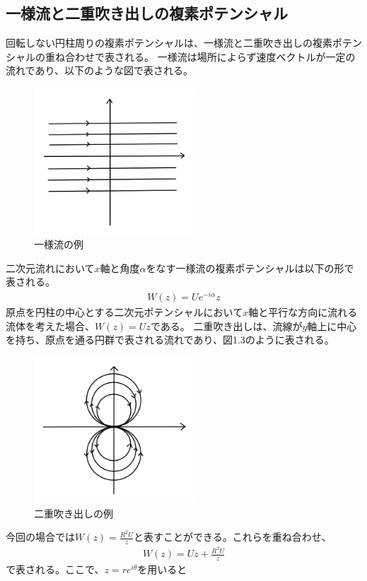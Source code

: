 \documentclass[10pt,b5paper,papersize,dvipdfmx]{jsbook}
\begin{document}
\subsection{一様流と二重吹き出しの複素ポテンシャル}
回転しない円柱周りの複素ポテンシャルは、一様流と二重吹き出しの複素ポテンシャルの重ね合わせで表される。
一様流は場所によらず速度ベクトルが一定の流れであり、以下のような図で表される。
\begin{figure}[ht]
  \centering
  \includegraphics[width=60mm]{img/ryuutai3.png}
  \caption{一様流の例}
\end{figure}
\par
二次元流れにおいて$x$軸と角度$\alpha$をなす一様流の複素ポテンシャルは以下の形で表される。
\begin{align}
  W(z) = Ue^{-i\alpha}z
\end{align}
原点を円柱の中心とする二次元ポテンシャルにおいて$x$軸と平行な方向に流れる流体を考えた場合、$W(z) = Uz$である。
二重吹き出しは、流線が$y$軸上に中心を持ち、原点を通る円群で表される流れであり、図1.3のように表される。
\begin{figure}[ht]
  \centering
  \includegraphics[width=60mm]{img/ryuutai2.png}
  \caption{二重吹き出しの例}
\end{figure}
今回の場合では$W(z) = \frac{R^2U}{z}$と表すことができる。これらを重ね合わせ、
\begin{align}
  W(z) = Uz + \frac{R^2U}{z}
\end{align}
で表される。ここで、$z = re^{i\theta}$を用いると
\end{document}
